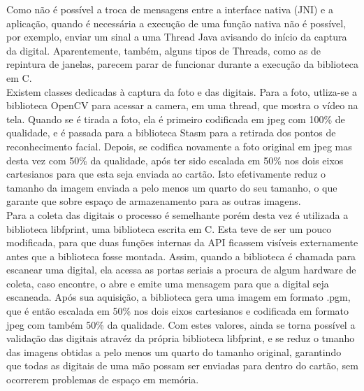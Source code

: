 \documentclass{article}
\begin{document}
\begin{justify}
		\hspace*{2cm}Como não é possível a troca de mensagens entre a interface nativa (JNI) e a aplicação, quando é necessária a execução de uma função nativa não é possível, por exemplo, enviar um sinal a uma Thread Java avisando do início da captura da digital. Aparentemente, também, alguns tipos de Threads, como as de repintura de janelas, parecem parar de funcionar durante a execução da biblioteca em C.\\
		\hspace*{2cm}Existem classes dedicadas à captura da foto e das digitais. Para a foto, utliza-se a biblioteca OpenCV para acessar a camera, em uma thread, que mostra o vídeo na tela. Quando se é tirada a foto, ela é primeiro codificada em jpeg com 100\% de qualidade, e é passada para a biblioteca Stasm para a retirada dos pontos de reconhecimento facial. Depois, se codifica novamente a foto original em jpeg mas desta vez com 50\% da qualidade, após ter sido escalada em 50\% nos dois eixos cartesianos para que esta seja enviada ao cartão. Isto efetivamente reduz o tamanho da imagem enviada a pelo menos um quarto do seu tamanho, o que garante que sobre espaço de armazenamento para as outras imagens.\\
		\hspace*{2cm}Para a coleta das digitais o processo é semelhante porém desta vez é utilizada a biblioteca libfprint, uma biblioteca escrita em C. Esta teve de ser um pouco modificada, para que duas funções internas da API ficassem visíveis externamente antes que a biblioteca fosse montada. Assim, quando a biblioteca é chamada para escanear uma digital, ela acessa as portas seriais a procura de algum hardware de coleta, caso encontre, o abre e emite uma mensagem para que a digital seja escaneada. Após sua aquisição, a biblioteca gera uma imagem em formato .pgm, que é então escalada em 50\% nos dois eixos cartesianos e codificada em formato jpeg com também 50\% da qualidade. Com estes valores, ainda se torna possível a validação das digitais atravéz da própria biblioteca libfprint, e se reduz o tmanho das imagens obtidas a pelo menos um quarto do tamanho original, garantindo que todas as digitais de uma mão possam ser enviadas para dentro do cartão, sem ocorrerem problemas de espaço em memória.\\

\end{justify}
\end{document}
